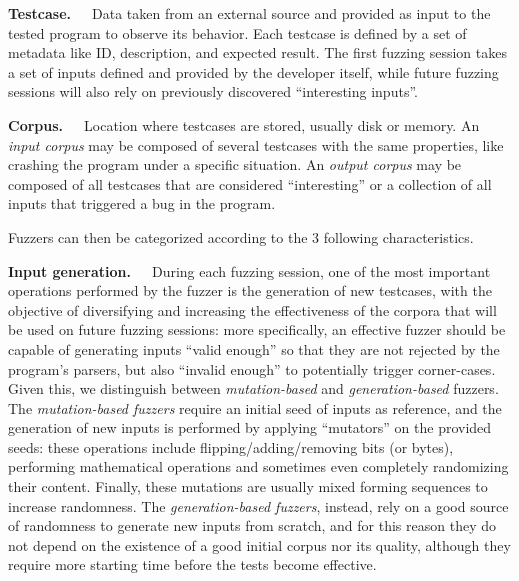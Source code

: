 \textbf{Testcase.}\ \ \ Data taken from an external source and provided as input to the tested program to observe its behavior. Each testcase is defined by a set of metadata like ID, description, and expected result. The first fuzzing session takes a set of inputs defined and provided by the developer itself, while future fuzzing sessions will also rely on previously discovered ``interesting inputs''. 

\textbf{Corpus.}\ \ \ Location where testcases are stored, usually disk or memory. An \textit{input corpus} may be composed of several testcases with the same properties, like crashing the program under a specific situation. An \textit{output corpus} may be composed of all testcases that are considered ``interesting'' or a collection of all inputs that triggered a bug in the program.


\newpage
Fuzzers can then be categorized according to the 3 following characteristics.

\textbf{Input generation.}\ \ \ During each fuzzing session, one of the most important operations performed by the fuzzer is the generation of new testcases, with the objective of diversifying and increasing the effectiveness of the corpora that will be used on future fuzzing sessions: more specifically, an effective fuzzer should be capable of generating inputs ``valid enough'' so that they are not rejected by the program's parsers, but also ``invalid enough'' to potentially trigger corner-cases. Given this, we distinguish between \textit{mutation-based} and \textit{generation-based} fuzzers. The \textit{mutation-based fuzzers} require an initial seed of inputs as reference, and the generation of new inputs is performed by applying ``mutators'' on the provided seeds: these operations include flipping/adding/removing bits (or bytes), performing mathematical operations and sometimes even completely randomizing their content. Finally, these mutations are usually mixed forming sequences to increase randomness. The \textit{generation-based fuzzers}, instead, rely on a good source of randomness to generate new inputs from scratch, and for this reason they do not depend on the existence of a good initial corpus nor its quality, although they require more starting time before the tests become effective.


